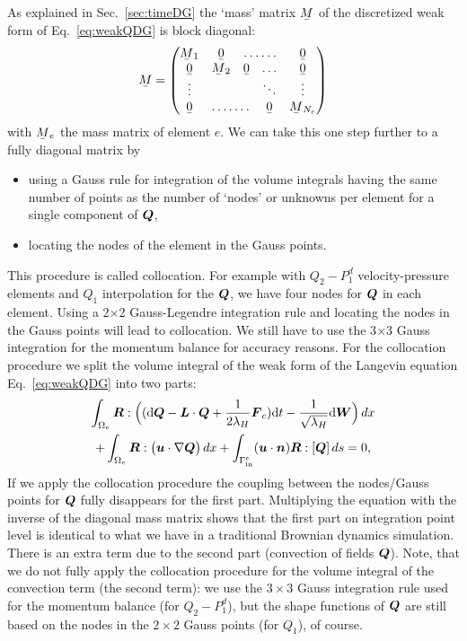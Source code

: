 As explained in Sec.~\ref{sec:timeDG} the `mass' matrix $\mat M$ of the
discretized weak form of Eq.~\eqref{eq:weakQDG} is block diagonal:
\begin{equation}
   \mat M=\begin{pmatrix}
              \mat M_1 & \mat 0 & \hdotsfor{2} & \mat 0 \\
              \mat 0 & \mat M_2 & \mat 0 & \ldots & \mat 0 \\
                              \vdots &  && \ddots  & \vdots \\
              \mat 0 & \hdotsfor{2} & \mat 0 & \mat M_{N_e}
      
          \end{pmatrix}
\end{equation}
with $\mat M_e$ the mass matrix of element $e$. We can take this one step
further to a fully diagonal matrix by
\begin{itemize}
   \item using a Gauss rule for integration of the volume integrals having the
     same number of points as the number of `nodes' or unknowns per element for
     a single component of $\boldsymbol{Q}$,
   \item locating the nodes of the element in the Gauss points.
\end{itemize}
This procedure is called collocation. For example with $Q_2-P_1^d$
 velocity-pressure
elements and $Q_1$ interpolation for the $\boldsymbol{Q}$,
we have four nodes for $\boldsymbol{Q}$
in each element. Using a 2$\times$2 Gauss-Legendre integration rule and
locating the nodes in the Gauss points will lead to collocation. We still have
to use the 3$\times$3 Gauss integration
for the momentum balance for accuracy reasons. For the collocation procedure
we split the volume integral of the weak form of the Langevin equation 
Eq.~\eqref{eq:weakQDG} into two parts:
\begin{multline}
 \int_{\Omega_e}\boldsymbol{R}:\Big(
 (\mathrm{d}\boldsymbol{Q} -\boldsymbol{L}\cdot\boldsymbol{Q} + \frac{1}{2\lambda_H}\boldsymbol{F}_c)
    \mathrm{d}t-\frac{1}{\sqrt{\lambda_H}}\mathrm{d}\boldsymbol{W}
\Big)\,d x\\+
 \int_{\Omega_e}\boldsymbol{R}:\big(
 \boldsymbol{u}\cdot\nabla\boldsymbol{Q} \big)\,d x
    +\int_{\Gamma^e_{\text{in}}}(\boldsymbol{u}\cdot\boldsymbol{n})\boldsymbol{R}:[\boldsymbol{Q}]\,d s = 0,
  \label{eq:weakQDG2}
\end{multline}
If we apply the collocation procedure the coupling between the nodes/Gauss
points for $\boldsymbol{Q}$ fully disappears for the first part. Multiplying the
equation with the inverse of the diagonal mass matrix shows that the first part
on integration point level is identical to what we have in a traditional
Brownian dynamics simulation. There is an extra term due to the second
part (convection of fields $\boldsymbol{Q}$). Note, that we do not fully apply the
collocation procedure for the volume integral of the convection term
(the second term): we use the $3\times3$ Gauss integration rule used for the
momentum balance (for $Q_2-P_1^d$), but the
shape functions of $\boldsymbol{Q}$ are still based on the nodes in the $2\times2$
Gauss points (for $Q_1$), of course.

